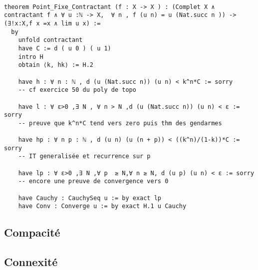 \documentclass[a4paper, 12pt]{article}
\begin{document}
\begin{verbatim}

theorem Point_Fixe_Contractant (f : X -> X ) : (Complet X ∧ contractant f ∧ ∀ u :ℕ -> X,  ∀ n , f (u n) = u (Nat.succ n )) -> (∃!x:X,f x =x ∧ lim u x) :=
  by
    unfold contractant
    have C := d ( u 0 ) ( u 1)
    intro H
    obtain ⟨k, hk⟩ := H.2
    
    have h : ∀ n : ℕ , d (u (Nat.succ n)) (u n) < k^n*C := sorry
    -- cf exercice 50 du poly de topo
    
    have l : ∀ ε>0 ,∃ N , ∀ n > N ,d (u (Nat.succ n)) (u n) < ε := sorry
    -- preuve que k^n*C tend vers zero puis thm des gendarmes
    
    have hp : ∀ n p : ℕ , d (u n) (u (n + p)) < ((k^n)/(1-k))*C := sorry
    -- IT generalisée et recurrence sur p
    
    have lp : ∀ ε>0 ,∃ N ,∀ p  ≥ N,∀ n ≥ N, d (u p) (u n) < ε := sorry
    -- encore une preuve de convergence vers 0
    
    have Cauchy : CauchySeq u := by exact lp
    have Conv : Converge u := by exact H.1 u Cauchy
\end{verbatim}

\subsection{Compacité}

\subsection{Connexité}

\newpage

\nocite{*}


\end{document}
